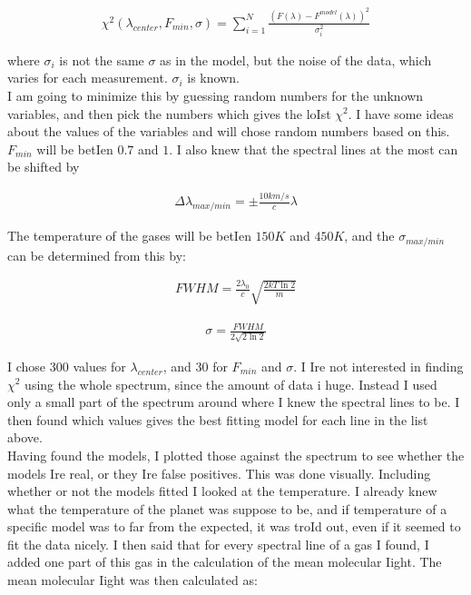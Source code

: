 \documentclass[a4paper, 10pt]{article}
\begin{document}
\begin{align}
\chi^2(\lambda_{center},F_{min},\sigma) = \sum_{i = 1}^N \frac{(F(\lambda) - F^{model}(\lambda))^2}{\sigma_i^2}
\end{align}

where $\sigma_i$ is not the same $\sigma$ as in the model, but the noise of the data, which varies for each measurement. $\sigma_i$ is known.\\

I am going to minimize this by guessing random numbers for the unknown variables, and then pick the numbers which gives the loIst $\chi^2$. I have some ideas about the values of the variables and will chose random numbers based on this. $F_{min}$ will be betIen $0.7$ and $1$. I also knew that the spectral lines at the most can be shifted by

\begin{align}
\Delta \lambda_{max/min} = \pm \frac{10 km/s}{c} \lambda
\end{align}

The temperature of the gases will be betIen $150K$ and $450K$, and the $\sigma_{max/min}$ can be determined from this by:

\begin{align}
FWHM = \frac{2 \lambda_0}{c}\sqrt{\frac{2kT \ln 2}{m}}
\end{align}

\begin{align}
\sigma = \frac{FWHM}{2\sqrt{2 \ln 2}}
\end{align}

I chose 300 values for $\lambda_{center}$, and 30 for $F_{min}$ and $\sigma$. I Ire not interested in finding $\chi^2$ using the whole spectrum, since the amount of data i huge. Instead I used only a small part of the spectrum around where I knew the spectral lines to be. I then found which values gives the best fitting model for each line in the list above.\\

Having found the models, I plotted those against the spectrum to see whether the models Ire real, or they Ire false positives. This was done visually. Including whether or not the models fitted I looked at the temperature. I already knew what the temperature of the planet was suppose to be, and if temperature of a specific model was to far from the expected, it was troId out, even if it seemed to fit the data nicely. I then said that for every spectral line of a gas I found, I added one part of this gas in the calculation of the mean molecular Iight. The mean molecular Iight was then calculated as:
\end{document}
